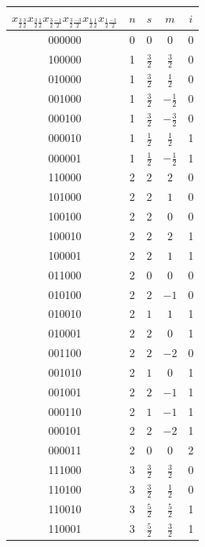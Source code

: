 \documentclass{article}
\begin{document}

   \begin{tabular}{|c|c|c|c|c|}
   \hline
       $x_{\frac{3}{2}\frac{3}{2}}x_{\frac{3}{2}\frac{1}{2}}x_{\frac{3}{2}\frac{-1}{2}}x_{\frac{3}{2}\frac{-3}{2}}x_{\frac{1}{2}\frac{1}{2}}x_{\frac{1}{2}\frac{-1}{2}}$ &$n$& $s$&$m$&$i$  \\ \hline
       000000 & 0& 0&0&0 \\\hline
       100000 & 1& $\frac{3}{2}$&$\frac{3}{2}$&0 \\\hline
       010000 & 1& $\frac{3}{2}$&$\frac{1}{2}$&0 \\\hline
       001000 & 1& $\frac{3}{2}$&$-\frac{1}{2}$&0 \\\hline
       000100 & 1& $\frac{3}{2}$&$-\frac{3}{2}$&0 \\\hline
       000010 & 1& $\frac{1}{2}$&$\frac{1}{2}$&1 \\\hline
       000001 & 1& $\frac{1}{2}$&$-\frac{1}{2}$&1 \\\hline
       110000 & 2&$2$ &$2$&0 \\\hline
       101000 & 2&$2$ &$1$&0 \\\hline
       100100 & 2&$2$ &$0$&0 \\\hline
       100010 & 2&$2$ &$2$&1 \\\hline
       100001 & 2&$2$ &$1$&1 \\\hline
       011000 & 2&$0$ &$0$&0 \\\hline
       010100 & 2&$2$ &$-1$&0 \\\hline
       010010 & 2& $1$&$1$&1 \\\hline
       010001 & 2&$2$ &$0$&1 \\\hline
       001100 & 2&$2$ &$-2$&0 \\\hline
       001010 & 2&$1$ &$0$&1 \\\hline
       001001 & 2&$2$ &$-1$&1 \\\hline
       000110 & 2&$1$ &$-1$&1 \\\hline
       000101 & 2&$2$ &$-2$&1 \\\hline
       000011 & 2&$0$ &$0$&2 \\\hline
       111000 & 3& $\frac{3}{2}$&$\frac{3}{2}$&0 \\\hline
       110100 & 3&$\frac{3}{2}$ &$\frac{1}{2}$&0 \\\hline 
       110010 & 3&$\frac{5}{2}$ &$\frac{5}{2}$&1 \\\hline 
       110001 & 3& $\frac{5}{2}$&$\frac{3}{2}$&1 \\\hline 

\end{tabular}
\end{document}
